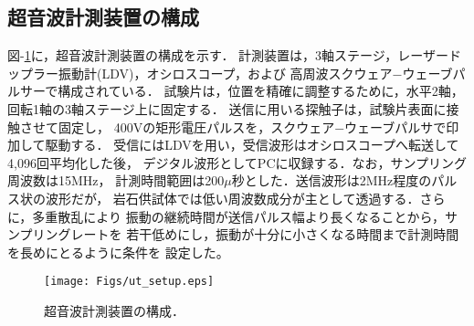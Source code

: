 \subsection{超音波計測装置の構成}
図-\ref{fig:fig3}に，超音波計測装置の構成を示す．
計測装置は，3軸ステージ，レーザードップラー振動計(LDV)，オシロスコープ，および
高周波スクウェア−ウェーブパルサーで構成されている．
試験片は，位置を精確に調整するために，水平2軸，回転1軸の3軸ステージ上に固定する．
送信に用いる探触子は，試験片表面に接触させて固定し，
400Vの矩形電圧パルスを，スクウェア−ウェーブパルサで印加して駆動する．
受信にはLDVを用い，受信波形はオシロスコープへ転送して4,096回平均化した後，
デジタル波形としてPCに収録する．なお，サンプリング周波数は15MHz，
計測時間範囲は200$\mu$秒とした．送信波形は2MHz程度のパルス状の波形だが，
岩石供試体では低い周波数成分が主として透過する．さらに，多重散乱により
振動の継続時間が送信パルス幅より長くなることから，サンプリングレートを
若干低めにし，振動が十分に小さくなる時間まで計測時間を長めにとるように条件を
設定した。
\begin{figure}[t]
\begin{center}
\texttt{[image: Figs/ut\_setup.eps]}
\caption{
	超音波計測装置の構成．
}
\label{fig:fig3}
\end{center}
\end{figure}
